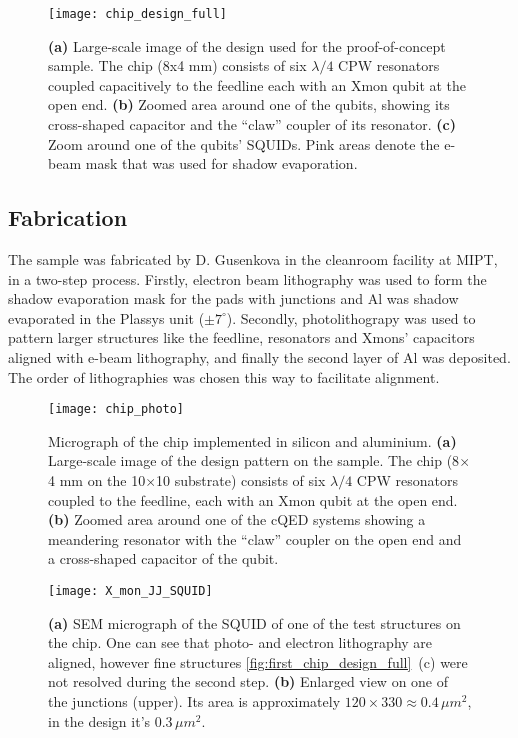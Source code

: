 \documentclass[12pt, twoside]{report}
\numberwithin{equation}{section}
\begin{document}
\begin{figure}[h!]
\centering
\texttt{[image: chip\_design\_full]}
\caption{\textbf{(a)} Large-scale image of the design used for the proof-of-concept sample. The chip (8x4 mm) consists of six $\lambda/4$ CPW resonators coupled capacitively to the feedline each with an Xmon qubit at the open end. \textbf{(b)} Zoomed area around one of the qubits, showing its cross-shaped capacitor and the ``claw'' coupler of its resonator. \textbf{(c)} Zoom around one of the qubits' SQUIDs. Pink areas denote the e-beam mask that was used for shadow evaporation.}
\label{fig:first_chip_design_full}
\end{figure}

\subsection{Fabrication}
The sample was fabricated by D. Gusenkova in the cleanroom facility at MIPT, in a two-step process. Firstly, electron beam lithography was used to form the shadow evaporation mask for the pads with junctions and Al was shadow evaporated in the Plassys unit ($\pm 7^\circ$). Secondly, photolithograpy was used to pattern larger structures like the feedline, resonators and Xmons' capacitors aligned with e-beam lithography, and finally the second layer of Al was deposited.	The order of lithographies was chosen this way to facilitate alignment.

\begin{figure}
\texttt{[image: chip\_photo]}
\caption{Micrograph of the chip implemented in silicon and aluminium. \textbf{(a)} Large-scale image of the design pattern on the sample. The chip (8$\times$4 mm on the 10$\times$10 substrate) consists of six $\lambda/4$ CPW resonators coupled to the feedline, each with an Xmon qubit at the open end. \textbf{(b)} Zoomed area around one of the cQED systems showing a meandering resonator with the ``claw'' coupler \cite{barends2013} on the open end and a cross-shaped capacitor of the qubit.}
\end{figure}

\begin{figure}
\centering
\texttt{[image: X\_mon\_JJ\_SQUID]}
\caption{\textbf{(a)} SEM micrograph of the SQUID of one of the test structures on the chip. One can see that photo- and electron lithography are aligned, however fine structures \autoref{fig:first_chip_design_full}~(c) were not resolved during the second step. \textbf{(b)} Enlarged view on one of the junctions (upper). Its area is approximately $120\times 330\approx 0.4\, \mu m^2$, in the design it's $0.3\,\mu m^2$.} 
\end{figure}
\end{document}
